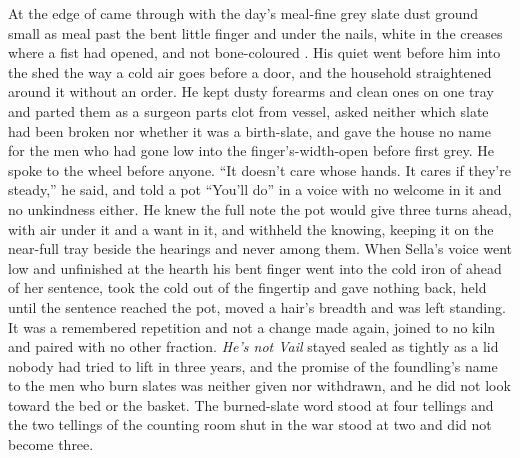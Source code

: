 At the edge of   came through with the day's meal-fine grey slate dust ground small as meal past the bent little finger and under the nails, white in the creases where a fist had opened, and not bone-coloured . His quiet went before him into the shed the way a cold air goes before a door, and the household straightened around it without an order. He kept dusty forearms and clean ones on one tray and parted them as a surgeon parts clot from vessel, asked neither which slate had been broken nor whether it was a birth-slate, and gave the house no name for the men who had gone low into the finger's-width-open  before first grey. He spoke to the wheel before anyone. “It doesn't care whose hands. It cares if they're steady,” he said, and told a pot “You'll do” in a voice with no welcome in it and no unkindness either. He knew the full note the pot would give three turns ahead, with air under it and a want in it, and withheld the knowing, keeping it on the near-full tray beside the hearings and never among them. When Sella's voice went low and unfinished at the hearth his bent finger went into the cold iron of  ahead of her sentence, took the cold out of the fingertip and gave nothing back, held until the sentence reached the pot, moved a hair's breadth and was left standing. It was a remembered repetition and not a change made again, joined to no kiln and paired with no other fraction. \emph{He's not Vail} stayed sealed as tightly as a lid nobody had tried to lift in three years, and the promise of the foundling's name to the men who burn slates was neither given nor withdrawn, and he did not look toward the bed or the basket. The burned-slate word stood at four tellings and the two tellings of the counting room shut in the war stood at two and did not become three.

\scenebreak

